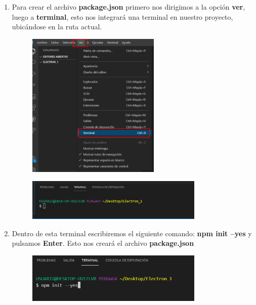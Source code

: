 \begin{enumerate}
    \item Para crear el archivo \textbf{package.json} primero nos dirigimos a la opción \textbf{ver}, luego a \textbf{terminal}, esto nos integrará una terminal en nuestro proyecto, ubicándose en la ruta actual.
    \begin{figure}[H]
        \centering
        \includegraphics[width=0.6\textwidth]{img/electron2.png}
    \end{figure}
    \begin{figure}[H]
        \centering
        \includegraphics[width=0.8\textwidth]{img/electron3.png}
    \end{figure}
    \newpage
    \item Dentro de esta terminal escribiremos el siguiente comando:\textbf{ npm init --yes} y pulsamos \textbf{Enter}. Esto nos creará el archivo \textbf{package.json}
    \begin{figure}[H]
        \centering
        \includegraphics[width=0.8\textwidth]{img/electron4.png}
    \end{figure}
    \begin{figure}[H]

\end{figure}
\end{enumerate}
